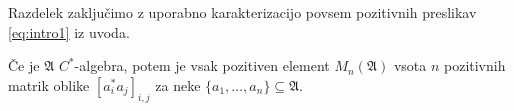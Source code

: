 Razdelek zaključimo z uporabno karakterizacijo povsem pozitivnih preslikav \eqref{eq:intro1}
iz uvoda.

\begin{lema}\label{lem:1.2}
    Če je $\mathfrak{A}$ $C^*$-algebra, potem je vsak pozitiven element $M_n (\mathfrak{A})$
    vsota $n$ pozitivnih matrik oblike $[a_i ^* a_j]_{i, j}$ za 
    neke $\{a_1, \dots, a_n\} \subseteq \mathfrak{A}$.
\end{lema}

